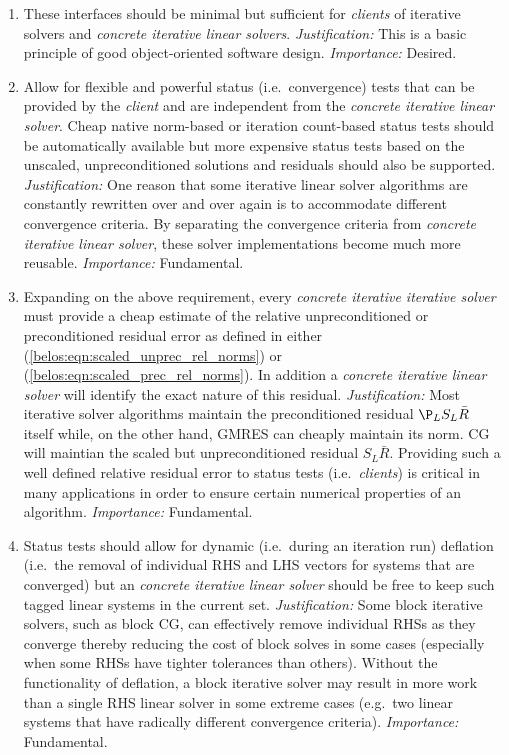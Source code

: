 \documentclass[pdf,ps2pdf,11pt]{SANDreport}
\begin{document}
\begin{enumerate}
\item

These interfaces should be minimal but sufficient for
{}\textit{clients} of iterative solvers and {}\textit{concrete
iterative linear solvers}.  {}\textit{Justification:} This is a basic
principle of good object-oriented software design.
{}\textit{Importance:} Desired.

\item

Allow for flexible and powerful status (i.e.~convergence) tests that
can be provided by the {}\textit{client} and are independent from the
{}\textit{concrete iterative linear solver}.  Cheap native norm-based
or iteration count-based status tests should be automatically
available but more expensive status tests based on the unscaled,
unpreconditioned solutions and residuals should also be supported.
{}\textit{Justification:} One reason that some iterative linear solver
algorithms are constantly rewritten over and over again is to
accommodate different convergence criteria.  By separating the
convergence criteria from {}\textit{concrete iterative linear solver},
these solver implementations become much more reusable.
{}\textit{Importance:} Fundamental.

\item

Expanding on the above requirement, every {}\textit{concrete iterative
iterative solver} must provide a cheap estimate of the relative
unpreconditioned or preconditioned residual error as defined in either
(\ref{belos:eqn:scaled_unprec_rel_norms}) or
(\ref{belos:eqn:scaled_prec_rel_norms}).  In addition a
{}\textit{concrete iterative linear solver} will identify the exact
nature of this residual.  {}\textit{Justification:} Most iterative
solver algorithms maintain the preconditioned residual $\P_L S_L
{}\bar{R}$ itself while, on the other hand, GMRES can cheaply maintain
its norm.  CG will maintian the scaled but unpreconditioned residual
$S_L {}\bar{R}$.  Providing such a well defined relative residual
error to status tests (i.e.~{}\textit{clients}) is critical in many
applications in order to ensure certain numerical properties of an
algorithm.  {}\textit{Importance:} Fundamental.

\item

Status tests should allow for dynamic (i.e.~during an iteration run)
deflation (i.e.~the removal of individual RHS and LHS vectors for
systems that are converged) but an {}\textit{concrete iterative linear
solver} should be free to keep such tagged linear systems in the
current set.  {}\textit{Justification:} Some block iterative solvers,
such as block CG, can effectively remove individual RHSs as they
converge thereby reducing the cost of block solves in some cases
(especially when some RHSs have tighter tolerances than others).
Without the functionality of deflation, a block iterative solver may
result in more work than a single RHS linear solver in some extreme
cases (e.g.~two linear systems that have radically different
convergence criteria).  {}\textit{Importance:} Fundamental.


\end{enumerate}
\end{document}
